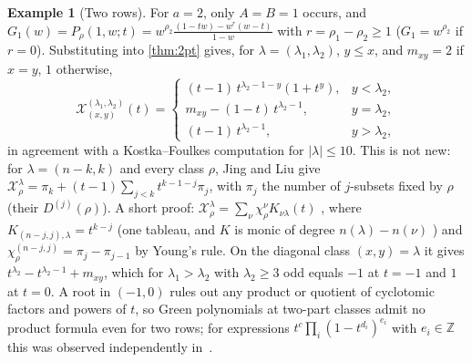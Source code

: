 \documentclass[submission]{FPSAC2027}
\theoremstyle{definition}
\newtheorem{example}[theorem]{Example}
\theoremstyle{remark}
\begin{document}
\begin{example}[Two rows]\label{ex:tworow}
For $a=2$, only $A=B=1$ occurs, and $G_1(w)=P_\rho(1,w;t)=w^{\rho_2}\frac{(1-tw)-w^r(w-t)}{1-w}$ with $r=\rho_1-\rho_2\ge1$ ($G_1=w^{\rho_2}$ if $r=0$). Substituting into \cref{thm:2pt} gives, for $\lambda=(\lambda_1,\lambda_2)$, $y\le x$, and $m_{xy}=2$ if $x=y$, $1$ otherwise,
\[ \mathcal X^{(\lambda_1,\lambda_2)}_{(x,y)}(t)=\begin{cases}(t-1)\,t^{\lambda_2-1-y}(1+t^{y}), & y<\lambda_2,\\ m_{xy}-(1-t)\,t^{\lambda_2-1}, & y=\lambda_2,\\ (t-1)\,t^{\lambda_2-1}, & y>\lambda_2,\end{cases} \]
in agreement with a Kostka--Foulkes computation for $|\lambda|\le10$. This is not new: for $\lambda=(n-k,k)$ and every class $\rho$, Jing and Liu \cite[Thm.~2.6, unnumbered display after (2.32), same in v1 and v2]{JingLiu21} give $\mathcal X^\lambda_\rho=\pi_k+(t-1)\sum_{j<k}t^{k-1-j}\pi_j$, with $\pi_j$ the number of $j$-subsets fixed by $\rho$ (their $D^{(j)}(\rho)$). A short proof: $\mathcal X^\lambda_\rho=\sum_\nu\chi^\nu_\rho K_{\nu\lambda}(t)$ \cite[III (7.6$'$)]{Macdonald95}, where $K_{(n-j,j),\lambda}=t^{k-j}$ (one tableau, and $K$ is monic of degree $n(\lambda)-n(\nu)$ \cite[III (6.5)]{Macdonald95}) and $\chi^{(n-j,j)}_\rho=\pi_j-\pi_{j-1}$ by Young's rule. On the diagonal class $(x,y)=\lambda$ it gives $t^{\lambda_2}-t^{\lambda_2-1}+m_{xy}$, which for $\lambda_1>\lambda_2$ with $\lambda_2\ge3$ odd equals $-1$ at $t=-1$ and $1$ at $t=0$. A root in $(-1,0)$ rules out any product or quotient of cyclotomic factors and powers of $t$, so Green polynomials at two-part classes admit no product formula even for two rows; for expressions $t^c\prod_i(1-t^{d_i})^{e_i}$ with $e_i\in\mathbb{Z}$ this was observed independently in~\cite[Thm.~D]{Clio26}.
\end{example}
\end{document}
